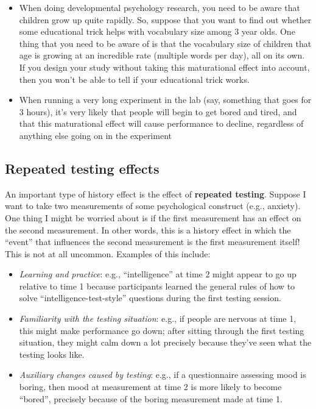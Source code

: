 \documentclass[]{book}
\begin{document}
\begin{itemize}
\item
  When doing developmental psychology research, you need to be aware that children grow up quite rapidly. So, suppose that you want to find out whether some educational trick helps with vocabulary size among 3 year olds. One thing that you need to be aware of is that the vocabulary size of children that age is growing at an incredible rate (multiple words per day), all on its own. If you design your study without taking this maturational effect into account, then you won't be able to tell if your educational trick works.
\item
  When running a very long experiment in the lab (say, something that goes for 3 hours), it's very likely that people will begin to get bored and tired, and that this maturational effect will cause performance to decline, regardless of anything else going on in the experiment
\end{itemize}

\hypertarget{repeated-testing-effects}{%
\subsection{Repeated testing effects}\label{repeated-testing-effects}}

An important type of history effect is the effect of \textbf{repeated testing}. Suppose I want to take two measurements of some psychological construct (e.g., anxiety). One thing I might be worried about is if the first measurement has an effect on the second measurement. In other words, this is a history effect in which the ``event'' that influences the second measurement is the first measurement itself! This is not at all uncommon. Examples of this include:

\begin{itemize}
\item
  {\emph{Learning and practice}}: e.g., ``intelligence'' at time 2 might appear to go up relative to time 1 because participants learned the general rules of how to solve ``intelligence-test-style'' questions during the first testing session.
\item
  {\emph{Familiarity with the testing situation}}: e.g., if people are nervous at time 1, this might make performance go down; after sitting through the first testing situation, they might calm down a lot precisely because they've seen what the testing looks like.
\item
  {\emph{Auxiliary changes caused by testing}}: e.g., if a questionnaire assessing mood is boring, then mood at measurement at time 2 is more likely to become ``bored'', precisely because of the boring measurement made at time 1.
\end{itemize}
\end{document}
